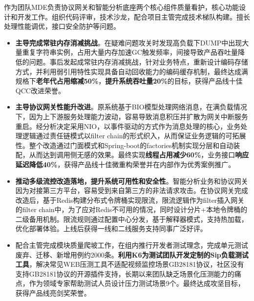 \documentclass{resume}
\begin{document}
\begin{onehalfspacing}
作为团队MDE负责协议网关和智能分析底座两个核心组件质量看护，核心功能设计和开发工作。组织代码评审，技术沙龙，配合项目主管完成技术梯队构建。擅长处理性能调优，接口安全防护等问题。
\begin{itemize}
  \item \textbf{主导完成常驻内存消减挑战}。在疑难问题攻关时发现高负载下DUMP中出现大量重复字符串实例，占用大量内存加速GC触发频率，间接导致产品吞吐量降低的问题。事后发起成常驻内存消减挑战，针对业务特点，重新设计编码存储方式，并利用弱引用特性实现具备自动回收能力的编码缓存机制，最终达成满规格下\textbf{老年代占用缩减50\%}，\textbf{提升系统吞吐量20\%}的目标，获得产品线十佳QCC改进荣誉。
  \item \textbf{主导协议网关性能升改进}。原系统基于BIO模型处理网络消息，在满负载情况下，因为上下游服务处理能力波动，容易导致消息积压并扩散为网关中断服务重启。经分析决定采用NIO，以事件驱动的方式作为消息处理的核心，业务处理逻辑通过责任链模式以filter chain的形式织入，从而保证业务逻辑的可拓展性。整个改造通过门面模式和Spring-boot的factories机制实现分层和自动装配，从而达到调用侧无感的效果。最终实现\textbf{线程占用减少60\%}，业务接口\textbf{响应延迟降低40\%}，获得产品线十佳微重构荣誉并在内部作为优秀案例推广。
  \item \textbf{推动多级流控改造落地，提升系统可用性和安全性}。智能分析业务和协议网关因为对接第三方平台，容易受到来自第三方的非法请求攻击。在协议网关完成改造后，基于Redis构建分布式令牌桶实现限流，限流逻辑作为filter插入网关的filter chain中，为了应对Redis不可用的情况，同时设计分片+本地令牌桶的二级备用机制。限流规则通过配置中心分发，基于解释器模式，支持热加载，优化部署体验。上线后获得一线和二线服务支持同事广泛好评。
  \item 配合主管完成模块质量爬坡工作，在组内推行开发者测试理念，完成单元测试废弃、迁移、新增用例约2000条。\textbf{利用K6为测试团队开发定制的Sip负载测试工具}，解决常见WEB压测工具不适配视频监控场景GB28181协议，社区没有支持GB28181协议的开源插件支持，长期以来团队缺乏场景化压测能力的痛点，作为领域专家帮助测试人员设计压力测试场景9个。最终达成攻坚目标，获得产品线亮剑奖荣誉。
\end{itemize}
\end{onehalfspacing}
\end{document}
